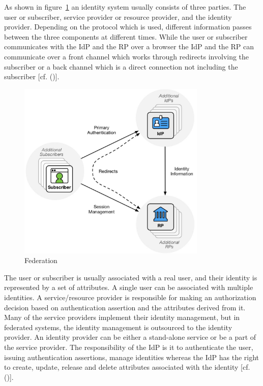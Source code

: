 {{	
	As shown in figure~\ref{fig:federation} an identity system usually consists of three parties. The user or subscriber, service provider or resource provider, and the identity provider. Depending on the protocol which is used, different information passes between the three components at different times. While the user or subscriber communicates with the IdP and the RP over a browser the IdP and the RP can communicate over a front channel which works through redirects involving the subscriber or a back channel which is a direct connection not including the subscriber [cf. (\cite{NIST:2017:DIGFA})]. 
	\begin{figure}[h]
		\centering
		\includegraphics[width=0.8\textwidth]{images/federation}
		\caption[Federation]{Federation}
		\label{fig:federation}
	\end{figure}
	
	
	The user or subscriber is usually associated with a real user, and their identity is represented by a set of attributes. A single user can be associated with multiple identities. A service/resource provider is responsible for making an authorization decision based on authentication assertion and the attributes derived from it. Many of the service providers implement their identity management, but in federated systems, the identity management is outsourced to the identity provider. An identity provider can be either a stand-alone service or be a part of the service provider. The responsibility of the IdP is it to authenticate the user, issuing authentication assertions, manage identities whereas the IdP has the right to create, update, release and delete attributes associated with the identity [cf. (\cite{Birell:2013:FIMS})]. 
	
}}
